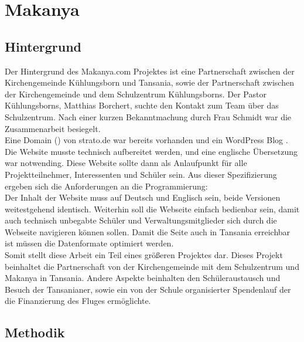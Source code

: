 \section{Makanya}

\subsection{Hintergrund} %
Der Hintergrund des Makanya.com Projektes ist eine Partnerschaft
zwischen der Kirchengemeinde Kühlungsborn und Tansania,
sowie der Partnerschaft zwischen der Kirchengemeinde und dem Schulzentrum Kühlungsborns.
Der Pastor Kühlungsborns, Matthias Borchert,
suchte den Kontakt zum \jf Team über das Schulzentrum.
Nach einer kurzen Bekanntmachung durch Frau Schmidt war die Zusammenarbeit besiegelt.\\
Eine Domain () von strato.de war bereits vorhanden%
und ein WordPress Blog .
Die Website musste technisch aufbereitet werden, und eine englische Übersetzung war notwending.
Diese Website sollte dann als Anlaufpunkt für alle Projektteilnehmer, Interessenten und Schüler sein.
Aus dieser Spezifizierung ergeben sich die Anforderungen an die Programmierung:\\
Der Inhalt der Website muss auf Deutsch und Englisch sein, beide Versionen weitestgehend identisch.
Weiterhin soll die Webseite einfach bedienbar sein,
damit auch technisch unbegabte Schüler und Verwaltungsmitglieder sich durch die Webseite navigieren können sollen.
Damit die Seite auch in Tansania erreichbar ist müssen die Datenformate optimiert werden.\\
Somit stellt diese Arbeit ein Teil eines größeren Projektes dar.
Dieses Projekt beinhaltet die Partnerschaft von der Kirchengemeinde mit dem Schulzentrum und Makanya in Tansania.
Andere Aspekte beinhalten den Schüleraustausch und Besuch der Tansanianer,
sowie ein von der Schule organisierter Spendenlauf der die Finanzierung des Fluges ermöglichte.

\subsection{Methodik} %

